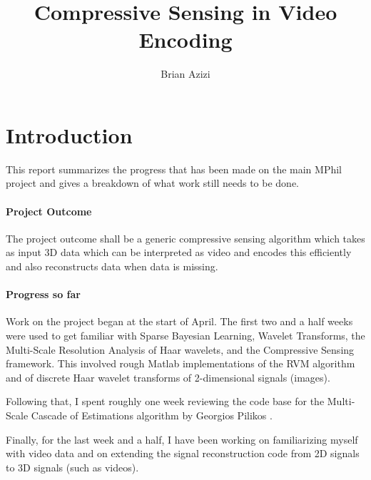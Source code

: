 \documentclass[final,3p]{report}
\begin{document}
\title{Compressive Sensing in Video Encoding}


\author{Brian Azizi}



\tableofcontents



\chapter{Introduction}
This report summarizes the progress that has been made on the main MPhil project and gives a breakdown of what work still needs to be done.

\subsubsection*{Project Outcome}The project outcome shall be a generic compressive sensing algorithm which takes as input 3D data which can be interpreted as video and encodes this efficiently and also reconstructs data when data is missing.

\subsubsection*{Progress so far}
Work on the project began at the start of April.
The first two and a half weeks were used to get familiar with Sparse Bayesian Learning, Wavelet Transforms, the Multi-Scale Resolution Analysis of Haar wavelets, and the Compressive Sensing framework.
This involved rough Matlab implementations of the RVM algorithm and of discrete Haar wavelet transforms of 2-dimensional signals (images).

Following that, I spent roughly one week reviewing the code base for the Multi-Scale Cascade of Estimations algorithm by Georgios Pilikos \cite{pilikos2014}.

Finally, for the last week and a half, I have been working on familiarizing myself with video data and on extending the signal reconstruction code from 2D signals to 3D signals (such as videos).
\end{document}
